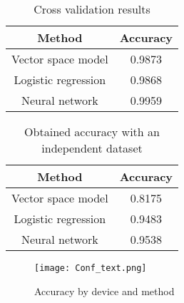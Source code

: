 \begin{table}
	\centering
	\caption{Cross validation results}
	\label{tab:crval}
	\begin{tabular}{||c|c||}
		\hline
		\textbf{Method}&\textbf{Accuracy} \\
		\hline
		Vector space model & 0.9873 \\
		Logistic regression & 0.9868\\
		Neural network & 0.9959\\
		\hline
	\end{tabular}
\end{table}



\begin{table}
	\centering
	\caption{Obtained accuracy with an independent dataset}
	\label{tab:inres}
	\begin{tabular}{||c|c||}
		\hline
		\textbf{Method}&\textbf{Accuracy} \\
		\hline
		Vector space model & 0.8175 \\
		Logistic regression & 0.9483\\
		Neural network & 0.9538\\
		\hline
	\end{tabular}
\end{table}

\begin{figure}
	\centering
	\texttt{[image: Conf\_text.png]}
	\caption{Accuracy by device and method}\label{fig:devAcc}
\end{figure}

